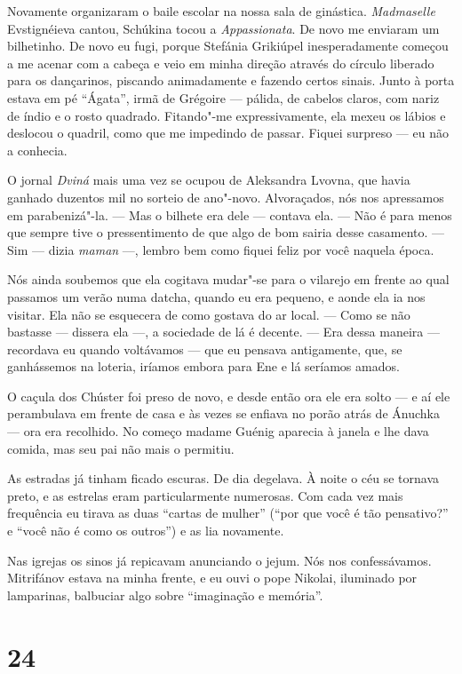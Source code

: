 Novamente organizaram o baile escolar na nossa sala de ginástica.
\emph{Madmaselle} Evstignéieva cantou, Schúkina tocou a
\emph{Appassionata}. De novo me enviaram um bilhetinho. De novo eu fugi,
porque Stefánia Grikiúpel inesperadamente começou a me acenar com a
cabeça e veio em minha direção através do círculo liberado para os
dançarinos, piscando animadamente e fazendo certos sinais. Junto à porta
estava em pé ``Ágata'', irmã de Grégoire --- pálida, de cabelos claros,
com nariz de índio e o rosto quadrado. Fitando"-me expressivamente, ela
mexeu os lábios e deslocou o quadril, como que me impedindo de passar.
Fiquei surpreso --- eu não a conhecia.

O jornal \emph{Dviná} mais uma vez se ocupou de Aleksandra Lvovna, que
havia ganhado duzentos mil no sorteio de ano"-novo. Alvoraçados, nós nos
apressamos em parabenizá"-la. --- Mas o bilhete era dele --- contava ela.
--- Não é para menos que sempre tive o pressentimento de que algo de bom
sairia desse casamento. --- Sim --- dizia \emph{maman} ---, lembro bem
como fiquei feliz por você naquela época.

Nós ainda soubemos que ela cogitava mudar"-se para o vilarejo em frente
ao qual passamos um verão numa datcha, quando eu era pequeno, e aonde
ela ia nos visitar. Ela não se esquecera de como gostava do ar local.
--- Como se não bastasse --- dissera ela ---, a sociedade de lá é
decente. --- Era dessa maneira --- recordava eu quando voltávamos ---
que eu pensava antigamente, que, se ganhássemos na loteria, iríamos
embora para Ene e lá seríamos amados.

O caçula dos Chúster foi preso de novo, e desde então ora ele era solto
--- e aí ele perambulava em frente de casa e às vezes se enfiava no
porão atrás de Ánuchka --- ora era recolhido. No começo madame Guénig
aparecia à janela e lhe dava comida, mas seu pai não mais o permitiu.

As estradas já tinham ficado escuras. De dia degelava. À noite o céu se
tornava preto, e as estrelas eram particularmente numerosas. Com cada
vez mais frequência eu tirava as duas ``cartas de mulher'' (``por que
você é tão pensativo?'' e ``você não é como os outros'') e as lia
novamente.

Nas igrejas os sinos já repicavam anunciando o jejum. Nós nos
confessávamos. Mitrifánov estava na minha frente, e eu ouvi o pope
Nikolai, iluminado por lamparinas, balbuciar algo sobre ``imaginação e
memória''.

\section{24}

